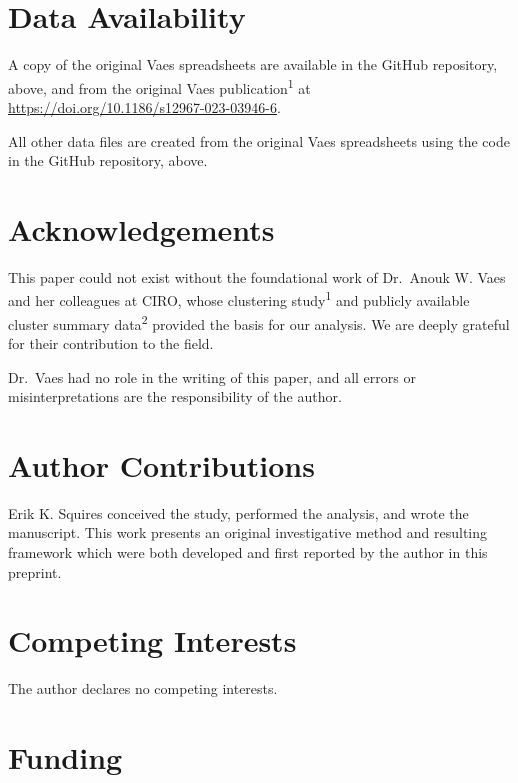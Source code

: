 \documentclass[
  letterpaper,
  DIV=11,
  numbers=noendperiod]{scrartcl}
\begin{document}
\section*{Data Availability}\label{sec-data}

A copy of the original Vaes spreadsheets are available in the GitHub
repository, above, and from the original Vaes
publication\textsuperscript{1} at
\url{https://doi.org/10.1186/s12967-023-03946-6}.

All other data files are created from the original Vaes spreadsheets
using the code in the GitHub repository, above.

\newpage{}

\section*{Acknowledgements}\label{acknowledgements}

This paper could not exist without the foundational work of Dr.~Anouk W.
Vaes and her colleagues at CIRO, whose clustering
study\textsuperscript{1} and publicly available cluster summary
data\textsuperscript{2} provided the basis for our analysis. We are
deeply grateful for their contribution to the field.

Dr.~Vaes had no role in the writing of this paper, and all errors or
misinterpretations are the responsibility of the author.

\section*{Author Contributions}\label{author-contributions}

Erik K. Squires conceived the study, performed the analysis, and wrote
the manuscript. This work presents an original investigative method and
resulting framework which were both developed and first reported by the
author in this preprint.

\section*{Competing Interests}\label{competing-interests}

The author declares no competing interests.

\section*{Funding}\label{funding}
\end{document}
